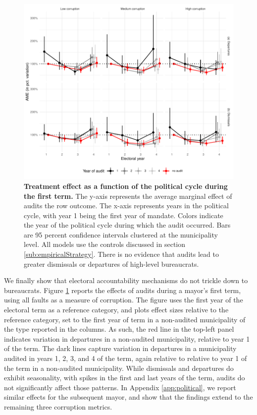 \begin{figure}[h]
    \centering
    \includegraphics{chapters/chapter_2/figures/AMEpolitical_term1Client.pdf}
    \caption{{\bf Treatment effect as a function of the political cycle during the first term.} The y-axis represents the average marginal effect of audits the row outcome. The x-axis represents years in the political cycle, with year 1 being the first year of mandate. Colors indicate the year of the political cycle during which the audit occurred. Bars are 95 percent confidence intervals clustered at the municipality level. All models use the controls discussed in section \ref{sub:empiricalStrategy}. There is no evidence that audits lead to greater dismissals or departures of high-level bureaucrats.}
    \label{fig:AMEpolitical1}
\end{figure}

We finally show that electoral accountability mechanisms do not trickle down to bureaucrats. Figure \ref{fig:AMEpolitical1} reports the effects of audits during a mayor's first term, using all faults as a measure of corruption. The figure uses the first year of the electoral term as a reference category, and plots effect sizes relative to the reference category, set to the first year of term in a non-audited municipality of the type reported in the columns. As such, the red line in the top-left panel indicates variation in departures in a non-audited municipality, relative to year 1 of the term. The dark lines capture variation in departures in a municipality audited in years 1, 2, 3, and 4 of the term, again relative to relative to year 1 of the term in a non-audited municipality. While dismissals and departures do exhibit seasonality, with spikes in the first and last years of the term, audits do not significantly affect those patterns. In Appendix \ref{app:political}, we report similar effects for the subsequent mayor, and show that the findings extend to the remaining three corruption metrics. 

